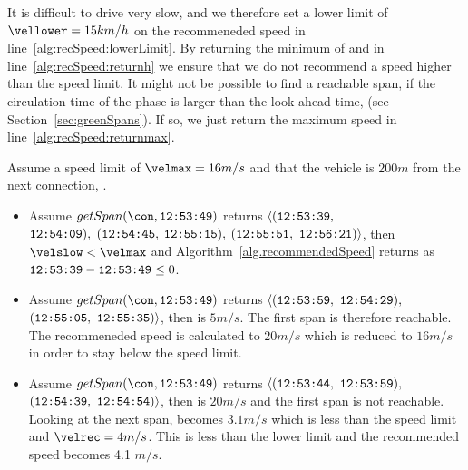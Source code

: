 It is difficult to drive very slow, and we therefore set a lower limit of $\vellower=15km/h$ on the recommeneded speed in line~\ref{alg:recSpeed:lowerLimit}. 
By returning the minimum of \velrec and \velmax in line~\ref{alg:recSpeed:returnh} we ensure that we do not recommend a speed higher than the speed limit.
It might not be possible to find a reachable span, if the circulation time of the phase is larger than the look-ahead time, \tmax (see Section~\ref{sec:greenSpans}).
If so, we just return the maximum speed in line~\ref{alg:recSpeed:returnmax}.

Assume a speed limit of $\velmax = 16 m/s$ and that the vehicle is $200 m$ from the next connection, \con.
\vspace{-4mm}
\begin{itemize}
\item Assume $getSpan(\con, \verb#12:53:49#)$ returns $\langle(\verb#12:53:39#,$\\$\verb#12:54:09#),$ $(\verb#12:54:45#,$ $\verb#12:55:15#),$ $(\verb#12:55:51#,$ $\verb#12:56:21#)\rangle$, then $\velslow < \velmax$ and Algorithm~\ref{alg.recommendedSpeed} returns \velmax as $\verb#12:53:39#-\verb#12:53:49# \leq 0$.

\item Assume $getSpan(\con, \verb#12:53:49#)$ returns $\langle(\verb#12:53:59#,$ $\verb#12:54:29#),$ $(\verb#12:55:05#,$ $\verb#12:55:35#)\rangle$, then \velslow is $5 m/s$.
The first span is therefore reachable. 
The recommeneded speed is calculated to $20m/s$ which is reduced to $16 m/s$ in order to stay below the speed limit.

\item Assume $getSpan(\con, \verb#12:53:49#)$ returns $\langle(\verb#12:53:44#,$ $\verb#12:53:59#),$ $(\verb#12:54:39#,$ $\verb#12:54:54#)\rangle$, then \velslow is $20 m/s$ and the first span is not reachable.
Looking at the next span, \velslow becomes $3.1m/s$ which is less than the speed limit and $\velrec = 4 m/s$. 
This is less than the lower limit and the recommended speed becomes 4.1 $m/s$.
\end{itemize}

